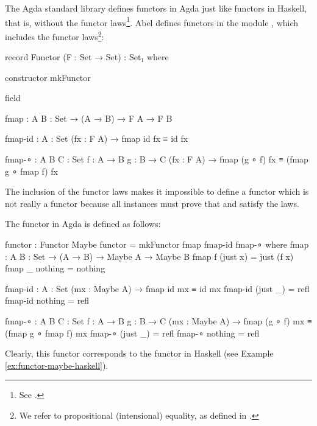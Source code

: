 The Agda standard library defines functors in Agda just like functors
in Haskell, that is, without the functor laws\footnote{See
  \parencite[module ]{danielsson-2013}.}.
Abel defines functors in the module ,
which includes the functor laws\footnote{We refer to propositional
  (intensional) equality, as defined in \parencite[module
    ]{danielsson-2013}.}:
\begin{codeagda}
record Functor (F : Set → Set) : Set₁ where

  constructor mkFunctor

  field

    fmap    : {A B : Set} → (A → B) → F A → F B

    fmap-id : {A : Set} (fx : F A) → fmap id fx ≡ id fx

    fmap-∘  : {A B C : Set} {f : A → B} {g : B → C}
              (fx : F A) → fmap (g ∘ f) fx ≡ (fmap g ∘ fmap f) fx
\end{codeagda}
The inclusion of the functor laws makes it impossible to define a
functor which is not really a functor because all instances must prove
that  and  satisfy the laws.

\begin{example}
  \label{ex:functor-maybe-agda}

  The  functor in Agda is defined as follows:
  \begin{codeagda}
functor : Functor Maybe
functor = mkFunctor fmap fmap-id fmap-∘
  where
    fmap : {A B : Set} → (A → B) → Maybe A → Maybe B
    fmap f (just x) = just (f x)
    fmap _ nothing  = nothing

    fmap-id : {A : Set} (mx : Maybe A) → fmap id mx ≡ id mx
    fmap-id (just _) = refl
    fmap-id nothing  = refl

    fmap-∘ : {A B C : Set} {f : A → B} {g : B → C}
             (mx : Maybe A) → fmap (g ∘ f) mx ≡ (fmap g ∘ fmap f) mx
    fmap-∘ (just _) = refl
    fmap-∘ nothing  = refl
  \end{codeagda}
  Clearly, this functor corresponds to the  functor
  in Haskell (see Example \ref{ex:functor-maybe-haskell}).

\end{example}

